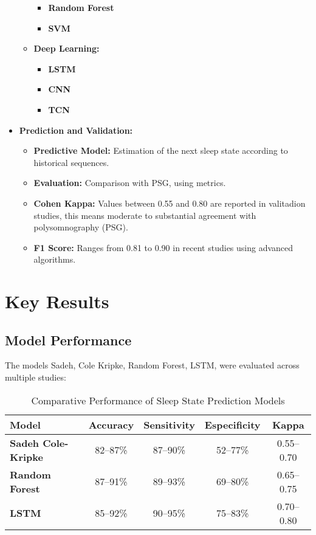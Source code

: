 \documentclass[conference]{IEEEtran}
\begin{document}
\begin{itemize}
\begin{itemize}
                     \begin{itemize}
                        \item \textbf{Random Forest} 
                        \item \textbf{SVM} 
                    \end{itemize}
                \item \textbf{Deep Learning:}
                    \begin{itemize}
                        \item \textbf{LSTM} 
                        \item \textbf{CNN}
                        \item \textbf{TCN} 
                    \end{itemize}
	      \end{itemize}
    \item \textbf{Prediction and Validation:}
            \begin{itemize}
		      \item \textbf{Predictive Model:} Estimation of the next sleep state according to historical sequences.
		      \item \textbf{Evaluation:} Comparison with PSG, using metrics.
                \item \textbf{Cohen Kappa:} Values between 0.55 and 0.80 are reported in valitadion studies, this means moderate to substantial agreement with polysomnography (PSG). 
                \item \textbf{F1 Score:} Ranges from 0.81 to 0.90 in recent studies using advanced algorithms.
	      \end{itemize}
    
\end{itemize}

\section{Key Results}

\subsection{Model Performance}
    The models Sadeh, Cole Kripke, Random Forest, LSTM, were evaluated across multiple studies:
    
\begin{table}[h]
\centering
\small
\begin{tabular}{|p{0.9cm}|c|c|c|c|}
\hline
\textbf{Model} & \textbf{Accuracy} & \textbf{Sensitivity} & \textbf{Especificity} & \textbf{Kappa} \\
\hline
\textbf{Sadeh Cole-Kripke} & 82--87\% & 87--90\% & 52--77\% & 0.55--0.70 \\
\hline
\textbf{Random Forest} & 87--91\% & 89--93\% & 69--80\% & 0.65--0.75 \\
\hline
\textbf{LSTM} & 85--92\% & 90--95\% & 75--83\% & 0.70--0.80 \\
\hline
\end{tabular}
\caption{Comparative Performance of Sleep State Prediction Models}
\label{tab:modelos}
\end{table}
\end{document}

